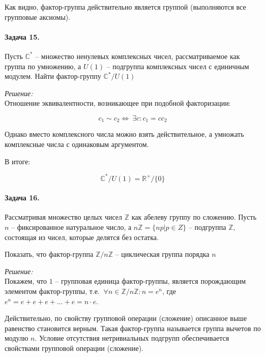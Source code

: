 \documentclass[10pt,a4paper]{article}
\begin{document}
	Как видно, фактор-группа действительно является группой (выполняются все 
	групповые аксиомы).
	
	\paragraph{Задача 15.} Пусть $\mathbb{C}^{*}$ -- множество ненулевых 
	комплексных чисел, рассматриваемое как группа по умножению, а $U
	\left(1\right)$ -- подгруппа комплексных чисел с единичным модулем. Найти
	фактор-группу $\mathbb{C}^{*}/U\left(1\right)$
	
	\textit{Решение:}\\
	
	Отношение эквивалентности, возникающее при подобной факторизации:
	
	\begin{equation}
		\label{eq:ex_15_eq_01}
		c_{1} \sim c_{2} \Leftrightarrow \ \exists c: c_{1} = cc_{2}
	\end{equation}
	
	Однако вместо комплексного числа можно взять действительное, а умножать 
	комплексные числа с одинаковым аргументом.
	
	В итоге:
 		
 	\begin{equation}
 		\label{eq:ex_15_eq_02}
 		\mathbb{C}^{*}/U\left(1\right) = \mathbb{R}^{+}/\lbrace 0 \rbrace
 	\end{equation}
 	
 	\paragraph{Задача 16.} Рассматривая множество целых чисел $\mathbb{Z}$ как
 	абелеву группу по сложению. Пусть $n$ -- фиксированное натуральное число, 
 	а $n\mathbb{Z} = \lbrace np | p \in Z\rbrace$ -- подгруппа $\mathbb{Z}$, 
 	состоящая из чисел, которые делятся без остатка.
 	
 	Показать, что фактор-группа $\mathbb{Z}/ n\mathbb{Z}$ -- циклическая группа 
 	порядка $n$
 	
 	\textit{Решение:}\\
 	
 	Покажем, что $1$ -- групповая единица фактор-группы, является порождающим 
 	элементом фактор-группы, т.е. $\ \forall n \in \mathbb{Z}/ n\mathbb{Z}: 
 	n = e^{n}$, где $e^{n} = e + e + e +\ldots + e = n \cdot e$.
 	
 	Действительно, по свойству групповой операции (сложение) описанное выше 
 	равенство становится верным. Такая фактор-группа называется группа вычетов 
 	по модулю $n$. Условие отсутствия нетривиальных подгрупп обеспечивается 
 	свойствами групповой операции (сложение).
 	
\end{document}

